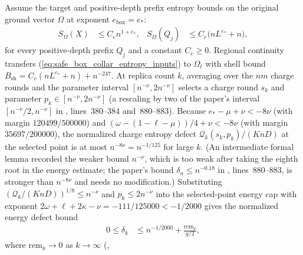 \documentclass{article}
\begin{document}
Assume the target and positive-depth prefix entropy bounds on the original
ground vector $\Omega$ at exponent $e_{\mathrm{box}} = e_*$:
\begin{align}
    S_\Omega(X)
     & \le C_e n^{1 + e_*},               &
    S_\Omega(Q_j)
     & \le C_e \bigl(n L^{e_*} + n\bigr),
    \label{eq:safe_box_collar_entropy_inputs}
\end{align}
for every positive-depth prefix $Q_j$ and a constant $C_e \ge 0$. Regional
continuity transfers (\ref{eq:safe_box_collar_entropy_inputs}) to $\Omega_t$
with shell bound $B_{\mathrm{sh}} = C_e(n L^{e_*} + n) + n^{-247}$. At replica
count $k$, averaging over the $n m$ charge rounds and the parameter interval
$[n^{-\nu}, 2n^{-\nu}]$ selects a charge round $s_k$ and parameter
$p_k \in [n^{-\nu}, 2n^{-\nu}]$ (a rescaling by two of the paper's interval
$[n^{-\nu}/2, n^{-\nu}]$ in , lines~380--384 and~880--883).
Because $e_* - \mu + \nu < -8\nu$ (with margin $120499/500000$) and
$(\omega - (1 - \ell - \mu))/4 + \nu < -8\nu$ (with margin $35697/200000$), the
normalized charge entropy defect $\mathcal Q_k(s_k, p_k)/(K n D)$ at the
selected point is at most $n^{-8\nu} = n^{-1/125}$ for large $k$. (An
intermediate formal lemma recorded the weaker bound $n^{-\nu}$, which is too
weak after taking the eighth root in the energy estimate; the paper's bound
$\delta_n \le n^{-0.18}$ in , lines~880--883, is stronger
than $n^{-8\nu}$ and needs no modification.) Substituting
$(\mathcal Q_k/(K n D))^{1/8} \le n^{-\nu}$ and $p_k \le 2n^{-\nu}$ into the
selected-point energy cap with exponent
$2\omega + \ell + 2\kappa - \nu = -111/125000 < -1/2000$ gives the normalized
energy defect bound
\begin{align}
    0 \le \delta_k
     & \le n^{-1/2000} + \frac{\mathrm{rem}_k}{g/2},
    \label{eq:safe_box_collar_energy_defect}
\end{align}
where $\mathrm{rem}_k \to 0$ as $k \to \infty$ (,
\end{document}
